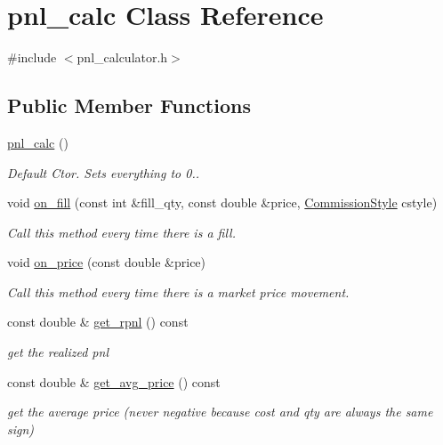\hypertarget{classpnl__calc}{}\section{pnl\+\_\+calc Class Reference}
\label{classpnl__calc}


{\ttfamily \#include $<$pnl\+\_\+calculator.\+h$>$}

\subsection*{Public Member Functions}
\begin{DoxyCompactItemize}
\item 
\hyperlink{classpnl__calc_a0b2bc0285a608ec5025b4918f386d18f}{pnl\+\_\+calc} ()
\begin{DoxyCompactList}\small\item\em Default Ctor. Sets everything to 0.. \end{DoxyCompactList}\item 
void \hyperlink{classpnl__calc_a542abad6402d68f140eaecfd1bb845a2}{on\+\_\+fill} (const int \&fill\+\_\+qty, const double \&price, \hyperlink{pnl__calculator_8h_ad733a3c57302a7ac3408d55dc65f2681}{Commission\+Style} cstyle)
\begin{DoxyCompactList}\small\item\em Call this method every time there is a fill. \end{DoxyCompactList}\item 
void \hyperlink{classpnl__calc_aa8fe2e20c0520c17dbba6a37066f2b9c}{on\+\_\+price} (const double \&price)
\begin{DoxyCompactList}\small\item\em Call this method every time there is a market price movement. \end{DoxyCompactList}\item 
const double \& \hyperlink{classpnl__calc_aab99d78b9e204b9a35c559e2f21db16a}{get\+\_\+rpnl} () const
\begin{DoxyCompactList}\small\item\em get the realized pnl \end{DoxyCompactList}\item 
const double \& \hyperlink{classpnl__calc_ab97da4de5a2d1b1c98b055b1256e0109}{get\+\_\+avg\+\_\+price} () const
\begin{DoxyCompactList}\small\item\em get the average price (never negative because cost and qty are always the same sign) \end{DoxyCompactList}\item 

\end{DoxyCompactItemize}
